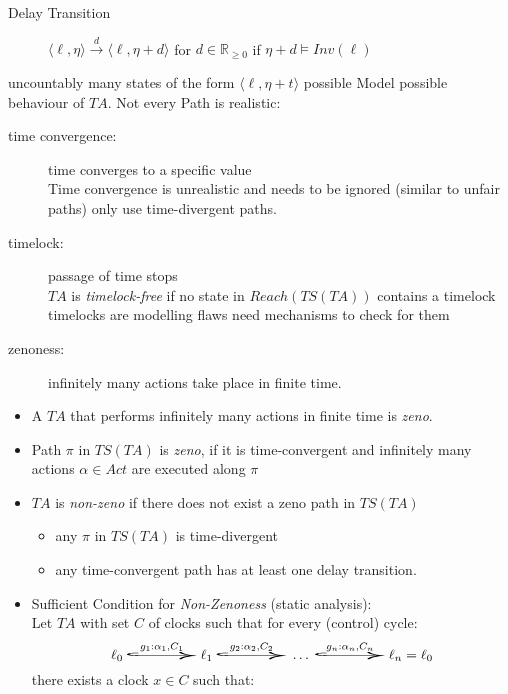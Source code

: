 \documentclass[a4paper, 10pt]{article}
\begin{document}
\begin{mdframed}
\begin{description}
\begin{itemize}
    \end{itemize}
    \item[Delay Transition] $\langle\ell,\eta\rangle\overset{d}{\longrightarrow}\langle\ell,\eta+d\rangle$ for $d\in\mathds{R}_{\geq0}$ if $\eta+d\models Inv(\ell)$
\end{description}
\follows uncountably many states of the form $\langle\ell,\eta+t\rangle$ possible
Model possible behaviour of $TA$. Not every Path is realistic:
\begin{description}
    \item[time convergence:] time converges to a specific value \\
    Time convergence is unrealistic and needs to be ignored (similar to unfair paths) \follows only use time-divergent paths.
    \item[timelock:] passage of time stops \\
    $TA$ is \emph{timelock-free} if no state in $Reach(TS(TA))$ contains a timelock \\
    timelocks are modelling flaws \follows need mechanisms to check for them
    \item[zenoness:] infinitely many actions take place in finite time. \\
\end{description}
\begin{itemize}
    \item A $TA$ that performs infinitely many actions in finite time is \emph{zeno}.
    \item Path $\pi$ in $TS(TA)$ is \emph{zeno}, if it is time-convergent and infinitely many actions $\alpha\in Act$ are executed along $\pi$
    \item $TA$ is \emph{non-zeno} if there does not exist a zeno path in $TS(TA)$
    \begin{itemize}
        \item any $\pi$ in $TS(TA)$ is time-divergent
        \item any time-convergent path has at least one delay transition.
    \end{itemize}
    \item Sufficient Condition for \emph{Non-Zenoness} (static analysis):\\
    Let $TA$ with set $C$ of clocks such that for every (control) cycle:
    \[ \ell_0\overset{g_1:\alpha_1,C_1}{\scalebox{5}[1]{$\hookrightarrow$}}\ell_1\overset{g_2:\alpha_2,C_2}{\scalebox{5}[1]{$\hookrightarrow$}}\dots\overset{g_n:\alpha_n,C_n}{\scalebox{5}[1]{$\hookrightarrow$}}\ell_n=\ell_0 \] there exists a clock $x\in C$ such that:

\end{itemize}
\end{mdframed}
\end{document}
